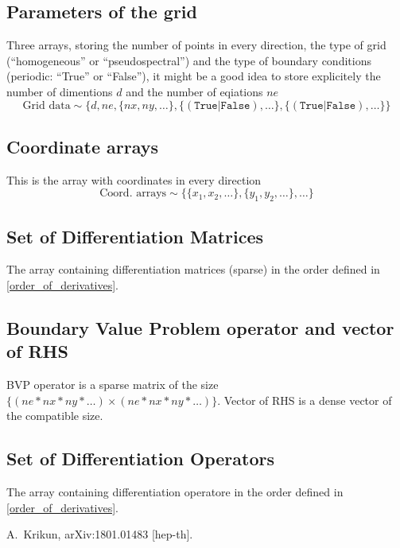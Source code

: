\documentclass[a4paper,12pt]{article}
\begin{document}
\subsection{\label{sec:grid_params} Parameters of the grid}
Three arrays, storing the number of points in every direction, the type of grid (``homogeneous'' or ``pseudospectral'') and the type of boundary conditions (periodic: ``True'' or ``False''), it might be a good idea to store explicitely the number of dimentions $d$ and the number of eqiations $ne$
\begin{equation}
\label{equ:grid_data}
\mbox{Grid data} \sim
\{d , ne, \{nx, ny, \dots\}, \{(\mathtt{True}| \mathtt{False}), \dots \}, \{(\mathtt{True}| \mathtt{False}), \dots \} \}
\end{equation}

\subsection{\label{sec:coord_arrays} Coordinate arrays}
This is the array with coordinates in every direction
\begin{equation}
\label{equ:coord_arrays}
\mbox{Coord. arrays} \sim
\{\{x_1, x_2 , \dots\}, \{y_1, y_2 , \dots\}, \dots \}
\end{equation}

\subsection{\label{sec:diff_mat_set} Set of Differentiation Matrices}
The array containing differentiation matrices (sparse) in the order defined in \eqref{order_of_derivatives}.

\subsection{\label{sec:BVP_oper} Boundary Value Problem operator and vector of RHS}
BVP operator is a sparse matrix of the size $\{(ne*nx*ny*\dots) \times (ne*nx*ny*\dots)\}$. Vector of RHS is a dense vector of the compatible size.

\subsection{\label{sec:diff_oper_set} Set of Differentiation Operators}
The array containing differentiation operatore in the order defined in \eqref{order_of_derivatives}.


\begin{thebibliography}{100}
  A.~Krikun,
  arXiv:1801.01483 [hep-th].


\end{thebibliography}
\end{document}
